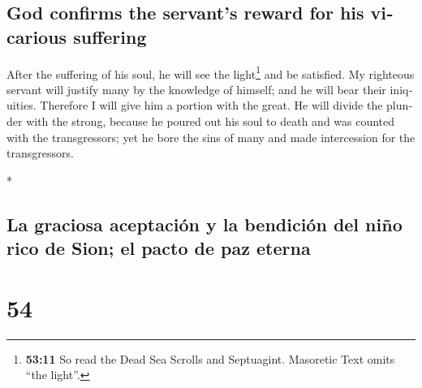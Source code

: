 \begin{paracol}{2}
\begin{otherlanguage}{english}
\hypertarget{god-confirms-the-servants-reward-for-his-vicarious-suffering}{%
\subsection{God confirms the servant's reward for his vicarious
suffering}\label{god-confirms-the-servants-reward-for-his-vicarious-suffering}}

 After the suffering of his soul, he will see the
light\footnote{\textbf{53:11} So read the Dead Sea Scrolls and
  Septuagint. Masoretic Text omits ``the light''.} and be satisfied. My
righteous servant will justify many by the knowledge of himself; and he
will bear their iniquities.  Therefore I will give him a
portion with the great. He will divide the plunder with the strong,
because he poured out his soul to death and was counted with the
transgressors; yet he bore the sins of many and made intercession for
the transgressors.

\end{otherlanguage}

\switchcolumn[0]*

\hypertarget{la-graciosa-aceptaciuxf3n-y-la-bendiciuxf3n-del-niuxf1o-rico-de-sion-el-pacto-de-paz-eterna}{%
\subsection{La graciosa aceptación y la bendición del niño rico de Sion;
el pacto de paz
eterna}\label{la-graciosa-aceptaciuxf3n-y-la-bendiciuxf3n-del-niuxf1o-rico-de-sion-el-pacto-de-paz-eterna}}

\hypertarget{section-106}{%
\section{54}\label{section-106}}


\end{paracol}
